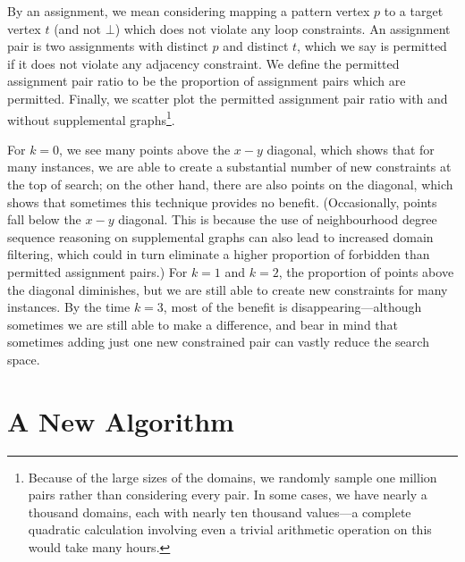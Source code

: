 \documentclass[letterpaper]{article}
\theoremstyle{definition}
\begin{document}
By an assignment, we mean considering mapping a pattern vertex $p$ to a target vertex $t$ (and not
$\bot$) which does not violate any loop constraints. An assignment pair is two assignments with
distinct $p$ and distinct $t$, which we say is permitted if it does not violate any adjacency
constraint. We define the permitted assignment pair ratio to be the proportion of assignment pairs
which are permitted.  Finally, we scatter plot the permitted assignment pair ratio with and without
supplemental graphs\footnote{Because of the large sizes of the domains, we randomly sample one
million pairs rather than considering every pair. In some cases, we have nearly a thousand domains,
each with nearly ten thousand values---a complete quadratic calculation involving even a trivial
arithmetic operation on this would take many hours.}.

For $k = 0$, we see many points above the $x-y$ diagonal, which shows that for many instances, we
are able to create a substantial number of new constraints at the top of search; on the other hand,
there are also points on the diagonal, which shows that sometimes this technique provides no
benefit. (Occasionally, points fall below the $x-y$ diagonal.  This is because the use of
neighbourhood degree sequence reasoning on supplemental graphs can also lead to increased domain
filtering, which could in turn eliminate a higher proportion of forbidden than permitted assignment
pairs.) For $k = 1$ and $k = 2$, the proportion of points above the diagonal diminishes, but we are
still able to create new constraints for many instances. By the time $k = 3$, most of the benefit is
disappearing---although sometimes we are still able to make a difference, and bear in mind that
sometimes adding just one new constrained pair can vastly reduce the search space.

\section{A New Algorithm}\label{section:algorithm}
\end{document}

